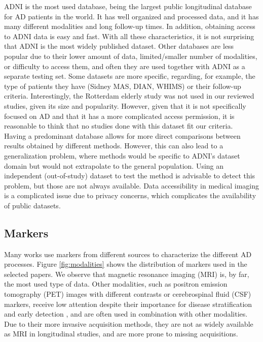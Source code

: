 ADNI \cite{Weiner2017} is the most used database, being the largest public longitudinal database for AD patients in the world. It has well organized and processed data, and it has many different modalities and long follow-up times. In addition, obtaining access to ADNI data is easy and fast. With all these characteristics, it is not surprising that ADNI is the most widely published dataset. Other databases are less popular due to their lower amount of data, limited/smaller number of modalities, or difficulty to access them, and often they are used together with ADNI \cite{Davatzikos2009,Eshaghi2017,Franke2012} as a separate testing set. Some datasets are more specific, regarding, for example, the type of patients they have (Sidney MAS, DIAN, WHIMS) or their follow-up criteria. Interestingly, the Rotterdam elderly study \cite{Ikram2017} was not used in our reviewed studies, given its size and popularity. However, given that it is not specifically focused on AD and that it has a more complicated access permission, it is reasonable to think that no studies done with this dataset fit our criteria.  \\

Having a predominant database allows for more direct comparisons between results obtained by different methods. However, this can also lead to a generalization problem, where methods would be specific to ADNI's dataset domain but would not extrapolate to the general population. Using an independent (out-of-study) dataset to test the method is advisable to detect this problem, but those are not always available. Data accessibility in medical imaging is a complicated issue due to privacy concerns, which complicates the availability of public datasets. \\

\subsection{Markers}

Many works use markers from different sources to characterize the different AD processes. Figure \ref{fig:modalities} shows the distribution of markers used in the selected papers. We observe that magnetic resonance imaging (MRI) is, by far, the most used type of data. Other modalities, such as positron emission tomography (PET) images with different contrasts or cerebrospinal fluid (CSF) markers, receive low attention despite their importance for disease stratification and early detection \cite{Andreasen1999,Clark2011,Weiner2005}, and are often used in combination with other modalities. Due to their more invasive acquisition methods, they are not as widely available as MRI in longitudinal studies, and are more prone to missing acquisitions. \\

